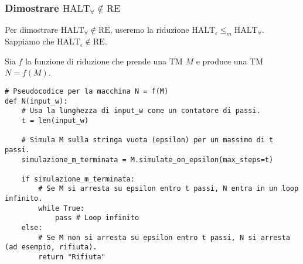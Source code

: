 \documentclass[a4paper]{article}
\begin{document}
\subsubsection{Dimostrare $\text{HALT}_\forall \notin \text{RE}$}
Per dimostrare $\text{HALT}_\forall \notin \text{RE}$, useremo la riduzione $\overline{\text{HALT}_\epsilon} \le_m \text{HALT}_\forall$.
Sappiamo che $\overline{\text{HALT}_\epsilon} \notin \text{RE}$.

Sia $f$ la funzione di riduzione che prende una TM $M$ e produce una TM $N = f(M)$.
\begin{verbatim}
# Pseudocodice per la macchina N = f(M)
def N(input_w):
    # Usa la lunghezza di input_w come un contatore di passi.
    t = len(input_w)
    
    # Simula M sulla stringa vuota (epsilon) per un massimo di t passi.
    simulazione_m_terminata = M.simulate_on_epsilon(max_steps=t)
    
    if simulazione_m_terminata:
        # Se M si arresta su epsilon entro t passi, N entra in un loop infinito.
        while True:
            pass # Loop infinito
    else:
        # Se M non si arresta su epsilon entro t passi, N si arresta (ad esempio, rifiuta).
        return "Rifiuta"
\end{verbatim}
\end{document}
